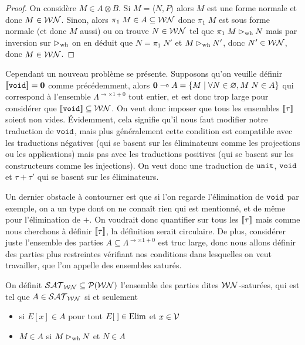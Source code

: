 \begin{proof}
    On considère $M\in A\otimes B$. Si $M = \langle N,P\rangle$ alors $M$ est une forme normale et donc $M\in\mathcal {WN}$. Sinon, alors $\pi_1\;M\in A\subseteq\mathcal {WN}$ donc $\pi_1\;M$ est sous forme normale (et donc $M$ aussi) ou on trouve $N\in\mathcal {WN}$ tel que $\pi_1\;M\rhd_{\mathrm{wh}} N$ mais par inversion sur $\rhd_{\mathrm{wh}}$ on en déduit que $N = \pi_1\;N'$ et $M\rhd_{\mathrm{wh}} N'$, donc $N'\in\mathcal {WN}$, donc $M\in\mathcal {WN}$.
\end{proof}

Cependant un nouveau problème se présente. Supposons qu'on veuille définir $[\![ \texttt{void} ]\!] = \boldsymbol 0$ comme précédemment, alors $\boldsymbol 0 \multimap A = \{M\mid \forall N\in\varnothing, M\;N\in A\}$ qui correspond à l'ensemble $\Lambda^{\to\times 1+0}$ tout entier, et est donc trop large pour considérer que $[\![ \texttt{void} ]\!] \subseteq \mathcal {WN}$. On veut donc imposer que tous les ensembles $[\![ \tau ]\!]$ soient non vides. \'Evidemment, cela signifie qu'il nous faut modifier notre traduction de $\texttt{void}$, mais plus généralement cette condition est compatible avec les traductions négatives (qui se basent sur les éliminateurs comme les projections ou les applications) mais pas avec les traductions positives (qui se basent sur les constructeurs comme les injections). On veut donc une traduction de $\texttt{unit}$, $\texttt{void}$ et $\tau+\tau'$ qui se basent sur les éliminateurs.

Un dernier obstacle à contourner est que si l'on regarde l'élimination de $\texttt{void}$ par exemple, on a un type dont on ne connaît rien qui est mentionné, et de même pour l'élimination de $+$. On voudrait donc quantifier sur tous les $[\![ \tau ]\!]$ mais comme nous cherchons à définir $[\![ \tau ]\!]$, la définition serait circulaire. De plus, considérer juste l'ensemble des parties $A\subseteq\Lambda^{\to\times1+0}$ est truc large, donc nous allons définir des parties plus restreintes vérifiant nos conditions dans lesquelles on veut travailler, que l'on appelle des ensembles saturés.

\begin{defi}
    On définit $\mathcal {SAT}_{\mathcal{WN}}\subseteq \mathcal P(\mathcal {WN})$ l'ensemble des parties dites $\mathcal {WN}$-saturées, qui est tel que $A\in \mathcal {SAT}_{\mathcal{WN}}$ si et seulement \begin{itemize}[label=$\bullet$]\item si $E[x]\in A$ pour tout $E[\;]\in\mathrm{Elim}$ et $x\in\mathcal V$ \item $M\in A$ si $M\rhd_{\mathrm{wh}} N$ et $N\in A$\end{itemize}
\end{defi}

